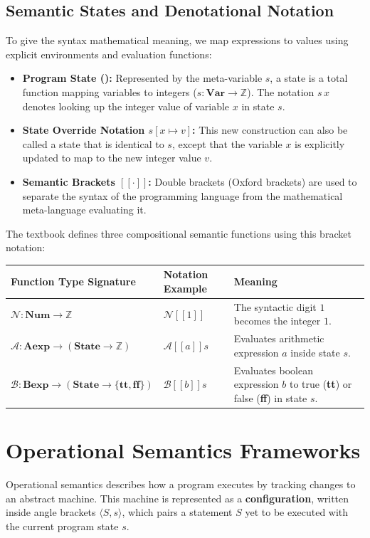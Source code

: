 \subsection*{Semantic States and Denotational Notation}
To give the syntax mathematical meaning, we map expressions to values using explicit environments and evaluation functions:
\begin{itemize}
    \item \textbf{Program State (\State):} Represented by the meta-variable $s$, a state is a total function mapping variables to integers (\(s : \mathbf{Var} \to \mathbb{Z}\)). The notation \(s \, x\) denotes looking up the integer value of variable $x$ in state $s$.
    \item \textbf{State Override Notation \(s[x \mapsto v]\):} This new construction can also be called a state that is identical to $s$, except that the variable $x$ is explicitly updated to map to the new integer value $v$.
    \item \textbf{Semantic Brackets \([\![\cdot]\!]\):} Double brackets (Oxford brackets) are used to separate the syntax of the programming language from the mathematical meta-language evaluating it. 
\end{itemize}
The textbook defines three compositional semantic functions using this bracket notation:
\begin{table}[H]
\centering
\begin{tabularx}{\textwidth}{llX}
\hline
\textbf{Function Type Signature} & \textbf{Notation Example} & \textbf{Meaning} \\ \hline
$\mathcal{N} : \mathbf{Num} \to \mathbb{Z}$ & $\mathcal{N}[\![1]\!]$ & The syntactic digit $1$ becomes the integer $1$. \\[1.8em]
$\mathcal{A} : \mathbf{Aexp} \to (\mathbf{State} \to \mathbb{Z})$ & $\mathcal{A}[\![a]\!]s$ & Evaluates arithmetic expression $a$ inside state $s$. \\[1.8em]
$\mathcal{B} : \mathbf{Bexp} \to (\mathbf{State} \to \{\mathbf{tt}, \mathbf{ff}\})$ & $\mathcal{B}[\![b]\!]s$ & Evaluates boolean expression $b$ to true (\textbf{tt}) or false (\textbf{ff}) in state $s$. \\ \hline
\end{tabularx}
\end{table}


\section{Operational Semantics Frameworks}
\label{background:sec:operational_semantics}
Operational semantics describes how a program executes by tracking changes to an abstract machine. This machine is represented as a \textbf{configuration}, written inside angle brackets \(\langle S, s \rangle\), which pairs a statement $S$ yet to be executed with the current program state $s$. 

